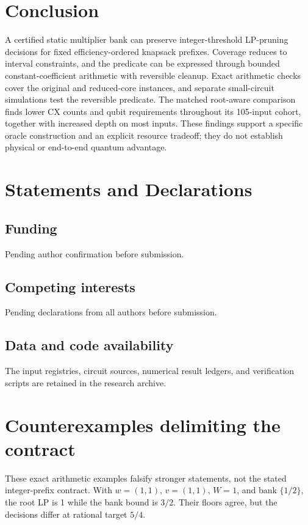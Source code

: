 \documentclass[referee,pdflatex,sn-mathphys-num]{sn-jnl}
\theoremstyle{thmstyleone}
\theoremstyle{thmstyletwo}
\begin{document}
\section{Conclusion}
A certified static multiplier bank can preserve integer-threshold LP-pruning decisions for fixed efficiency-ordered knapsack prefixes. Coverage reduces to interval constraints, and the predicate can be expressed through bounded constant-coefficient arithmetic with reversible cleanup. Exact arithmetic checks cover the original and reduced-core instances, and separate small-circuit simulations test the reversible predicate. The matched root-aware comparison finds lower CX counts and qubit requirements throughout its 105-input cohort, together with increased depth on most inputs. These findings support a specific oracle construction and an explicit resource tradeoff; they do not establish physical or end-to-end quantum advantage.

\backmatter
\section*{Statements and Declarations}
\subsection*{Funding}
Pending author confirmation before submission.
\subsection*{Competing interests}
Pending declarations from all authors before submission.
\subsection*{Data and code availability}
The input registries, circuit sources, numerical result ledgers, and verification scripts are retained in the research archive.

\appendix
\section{Counterexamples delimiting the contract}\label{app:counterexamples}
These exact arithmetic examples falsify stronger statements, not the stated integer-prefix contract. With $w=(1,1)$, $v=(1,1)$, $W=1$, and bank $\{1/2\}$, the root LP is 1 while the bank bound is $3/2$. Their floors agree, but the decisions differ at rational target $5/4$.
\end{document}

